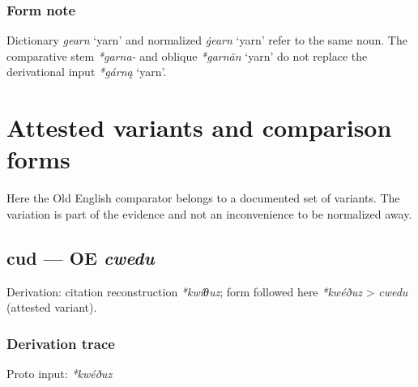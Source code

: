 \documentclass[
  british,
  a4paper,
  openany]{book}
\providecommand{\Recon}[1]{\emph{*#1}}
{\catcode`→=\active \global\def→{\ensuremath{\rightarrow}}}
\providecommand{\texorpdfstring}[2]{#1}
\providecommand{\Recon}[1]{\emph{*#1}}
{\catcode`→=\active \global\def→{\ensuremath{\rightarrow}}}
\begin{document}
\subsection{Form note}\label{form-note-27}

Dictionary \emph{gearn} `yarn' and normalized \emph{ġearn} `yarn' refer
to the same noun. The comparative stem \emph{*garna-} and oblique
\Recon{garnăn} `yarn' do not replace the derivational input
\Recon{gárną} `yarn'.

\clearpage

\chapter{Attested variants and comparison
forms}\label{attested-variants-and-comparison-forms}

Here the Old English comparator belongs to a documented set of variants.
The variation is part of the evidence and not an inconvenience to be
normalized away.

\section{\texorpdfstring{cud --- OE
\emph{cwedu}}{cud --- OE cwedu}}\label{cud-oe-cwedu}


Derivation: citation reconstruction \emph{*kwíθuz}; form followed here
\emph{*kwéðuz} \textgreater{} \emph{cwedu} (attested variant).

\subsection{Derivation trace}\label{derivation-trace-70}

Proto input: \emph{*kwéðuz}

\begingroup
\setlength{\fboxsep}{6pt}
\end{document}
